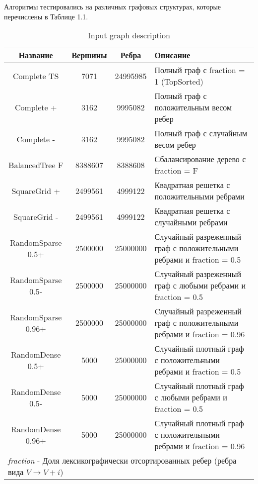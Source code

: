 Алгоритмы тестировались на различных графовых структурах, которые перечислены в Таблице 1.1. 
\FloatBarrier
\begin{table}[H]
\centering
\begin{tabular}{c | c | c | l}  
Название & Вершины & Ребра & Описание\\
\hline\hline
Complete TS & 7071 & 24995985 & Полный граф с fraction = 1 (TopSorted)\\  
Complete + & 3162 & 9995082 & Полный граф с положительным весом ребер \\  
Complete - & 3162 & 9995082 & Полный граф с случайным весом ребер \\  
BalancedTree F & 8388607 & 8388608 & Сбалансирование дерево с fraction = F \\  
SquareGrid + & 2499561 & 4999122 & Квадратная решетка с положительными ребрами \\  
SquareGrid - & 2499561 & 4999122 & Квадратная решетка с случайными ребрами \\  
RandomSparse 0.5+ & 2500000 & 25000000 & \pbox{9cm}{Случайный разреженный граф с положительными ребрами и fraction = 0.5\\}  \\  
RandomSparse 0.5- & 2500000 & 25000000 & \pbox{9cm}{Случайный разреженный граф с любыми ребрами и fraction = 0.5\\}  \\  
RandomSparse 0.96+ & 2500000 & 25000000 & \pbox{9cm}{Cлучайный разреженный граф с положительными ребрами и fraction = 0.96\\} \\  
RandomDense 0.5+ & 5000 & 25000000 & \pbox{9cm}{Случайный плотный граф с положительными ребрами и fraction = 0.5\\}  \\  
RandomDense 0.5- & 5000 & 25000000 & \pbox{9cm}{Случайный плотный граф с любыми ребрами и fraction = 0.5\\}  \\  
RandomDense 0.96+ & 5000 & 25000000 & \pbox{9cm}{Случайный плотный граф с положительными ребрами и fraction = 0.96\\}  \\  
\hline
\multicolumn{4}{l}{\footnotesize \textit{fraction} - Доля лексикографически отсортированных ребер (ребра вида $V \rightarrow V+i$) }\\
\end{tabular}

\caption{Input graph description}
\label{bf_algo_comparison}
\end{table}
